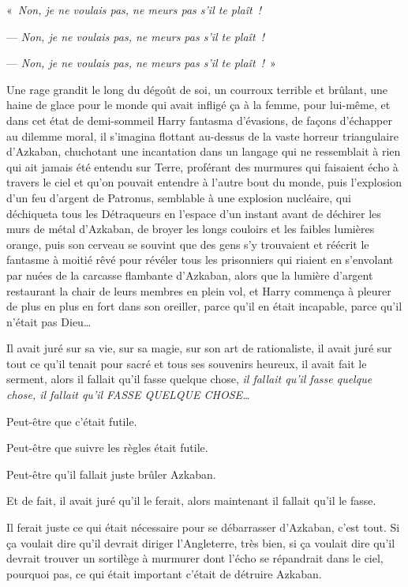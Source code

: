 «~\emph{Non, je ne voulais pas, ne meurs pas s'il te plaît~!}

--- \emph{Non, je ne voulais pas, ne meurs pas s'il te plaît~!}

--- \emph{Non, je ne voulais pas, ne meurs pas s'il te plaît~!}~»

Une rage grandit le long du dégoût de soi, un courroux terrible et brûlant, une haine de glace pour le monde qui avait infligé ça à la femme, pour lui-même, et dans cet état de demi-sommeil Harry fantasma d'évasions, de façons d'échapper au dilemme moral, il s'imagina flottant au-dessus de la vaste horreur triangulaire d'Azkaban, chuchotant une incantation dans un langage qui ne ressemblait à rien qui ait jamais été entendu sur Terre, proférant des murmures qui faisaient écho à travers le ciel et qu'on pouvait entendre à l'autre bout du monde, puis l'explosion d'un feu d'argent de Patronus, semblable à une explosion nucléaire, qui déchiqueta tous les Détraqueurs en l'espace d'un instant avant de déchirer les murs de métal d'Azkaban, de broyer les longs couloirs et les faibles lumières orange, puis son cerveau se souvint que des gens s'y trouvaient et réécrit le fantasme à moitié rêvé pour révéler tous les prisonniers qui riaient en s'envolant par nuées de la carcasse flambante d'Azkaban, alors que la lumière d'argent restaurant la chair de leurs membres en plein vol, et Harry commença à pleurer de plus en plus en fort dans son oreiller, parce qu'il en était incapable, parce qu'il n'était pas Dieu…

Il avait juré sur sa vie, sur sa magie, sur son art de rationaliste, il avait juré sur tout ce qu'il tenait pour sacré et tous ses souvenirs heureux, il avait fait le serment, alors il fallait qu'il fasse quelque chose, \emph{il fallait qu'il fasse quelque chose, il fallait qu'il FASSE QUELQUE CHOSE…}

Peut-être que c'était futile.

Peut-être que suivre les règles était futile.

Peut-être qu'il fallait juste brûler Azkaban.

Et de fait, il avait juré qu'il le ferait, alors maintenant il fallait qu'il le fasse.

Il ferait juste ce qui était nécessaire pour se débarrasser d'Azkaban, c'est tout. Si ça voulait dire qu'il devrait diriger l'Angleterre, très bien, si ça voulait dire qu'il devrait trouver un sortilège à murmurer dont l'écho se répandrait dans le ciel, pourquoi pas, ce qui était important c'était de détruire Azkaban.

